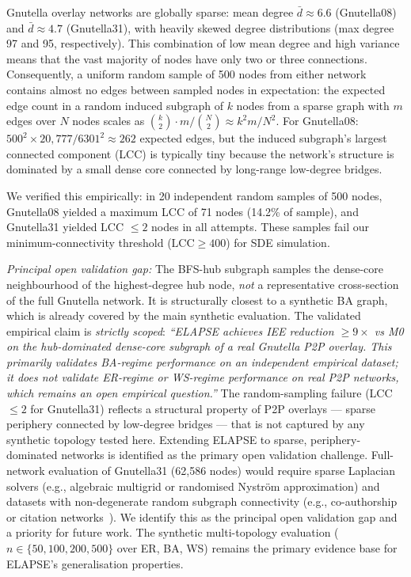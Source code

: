 \documentclass[review,12pt]{elsarticle}
\begin{document}
Gnutella overlay networks are globally sparse: mean degree $\bar{d} \approx 6.6$
(Gnutella08) and $\bar{d} \approx 4.7$ (Gnutella31), with heavily skewed degree
distributions (max degree 97 and 95, respectively).
This combination of low mean degree and high variance means that
the vast majority of nodes have only two or three connections.
Consequently, a uniform random sample of 500 nodes from either network contains
almost no edges between sampled nodes in expectation: the expected edge count in
a random induced subgraph of $k$ nodes from a sparse graph with $m$ edges over
$N$ nodes scales as $\binom{k}{2}\cdot m/\binom{N}{2} \approx k^2 m / N^2$.
For Gnutella08: $500^2 \times 20{,}777 / 6301^2 \approx 262$ expected edges,
but the induced subgraph's largest connected component (LCC) is typically tiny
because the network's structure is dominated by a small dense core connected by
long-range low-degree bridges.

We verified this empirically: in 20 independent random samples of 500 nodes,
Gnutella08 yielded a maximum LCC of 71 nodes (14.2\% of sample),
and Gnutella31 yielded LCC $\leq 2$ nodes in all attempts.
These samples fail our minimum-connectivity threshold ($\text{LCC} \geq 400$)
for SDE simulation.

\emph{Principal open validation gap:}
The BFS-hub subgraph samples the dense-core neighbourhood of the highest-degree
hub node, \emph{not} a representative cross-section of the full Gnutella network.
It is structurally closest to a synthetic BA graph, which is already covered
by the main synthetic evaluation.
The validated empirical claim is \emph{strictly scoped}:
\emph{``ELAPSE achieves IEE reduction ${\geq}9\times$ vs M0 on the
hub-dominated dense-core subgraph of a real Gnutella P2P overlay.
This primarily validates BA-regime performance on an independent empirical
dataset; it does not validate ER-regime or WS-regime performance on
real P2P networks, which remains an open empirical question.''}
The random-sampling failure (LCC $\leq 2$ for Gnutella31) reflects a
structural property of P2P overlays --- sparse periphery connected by
low-degree bridges --- that is not captured by any synthetic topology
tested here.  Extending ELAPSE to sparse, periphery-dominated networks
is identified as the primary open validation challenge.
Full-network evaluation of Gnutella31 (62{,}586 nodes) would require sparse
Laplacian solvers (e.g., algebraic multigrid or randomised Nystr\"{o}m
approximation) and datasets with non-degenerate random subgraph connectivity
(e.g., co-authorship or citation networks~\cite{snapnets}).
We identify this as the principal open validation gap and a priority for
future work.  The synthetic multi-topology evaluation ($n \in \{50,100,200,500\}$
over ER, BA, WS) remains the primary evidence base for ELAPSE's generalisation
properties.
\end{document}
